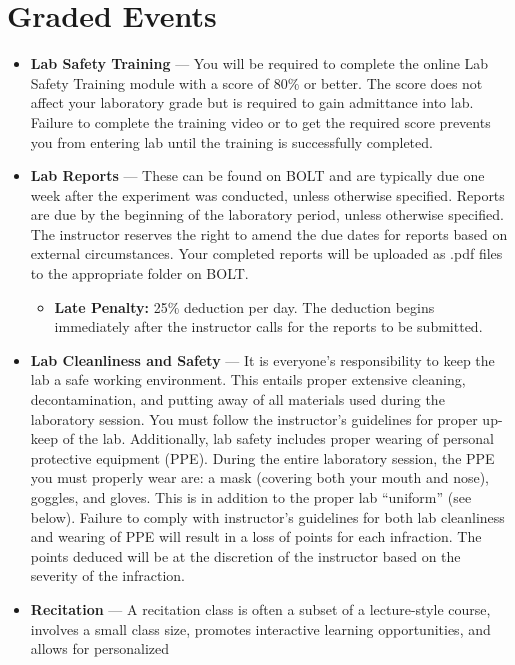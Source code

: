 \documentclass[10pt,letterpaper]{article}
\begin{document}
\section*{Graded Events}
\begin{itemize}
	\item \textbf{Lab Safety Training} --- You will be
		required to complete the online Lab Safety Training module with
		a score of 80\% or better. The score does not affect your
		laboratory grade but is required to gain admittance into lab.
		Failure to complete the training video or to get the required
		score prevents you from entering lab until the training is
		successfully completed. 
	\item \textbf{Lab Reports} --- These can be found on BOLT and are
		typically due one week after the experiment was conducted,
		unless otherwise specified.  Reports are due by the beginning of
		the laboratory period, unless otherwise specified.  The
		instructor reserves the right to amend the due dates for reports
		based on external circumstances.  Your completed reports will be
		uploaded as .pdf files to the appropriate folder on BOLT. 
		\begin{itemize}
			\item \textbf{Late Penalty:} 25\% deduction per day.
				The deduction begins immediately after the
				instructor calls for the reports to be
				submitted.
		\end{itemize}
	\item \textbf{Lab Cleanliness and Safety} --- It is everyone's responsibility
		to keep the lab a safe working environment.  This entails proper
		extensive cleaning, decontamination, and putting away of all
		materials used during the laboratory session.  You must follow
		the instructor's guidelines for proper up-keep of the lab.
		Additionally, lab safety includes proper wearing of personal
		protective equipment (PPE).  During the entire laboratory
		session, the PPE you must properly wear are: a mask (covering
		both your mouth and nose), goggles, and gloves.  This is in
		addition to the proper lab ``uniform'' (see below).  Failure to
		comply with instructor’s guidelines for both lab cleanliness and
		wearing of PPE will result in a loss of points for each
		infraction.  The points deduced will be at the discretion of the
		instructor based on the severity of the infraction.   
	\item \textbf{Recitation} --- A recitation class is often a subset of a
		lecture-style course, involves a small class size, promotes
		interactive learning opportunities, and allows for personalized

\end{itemize}
\end{document}
